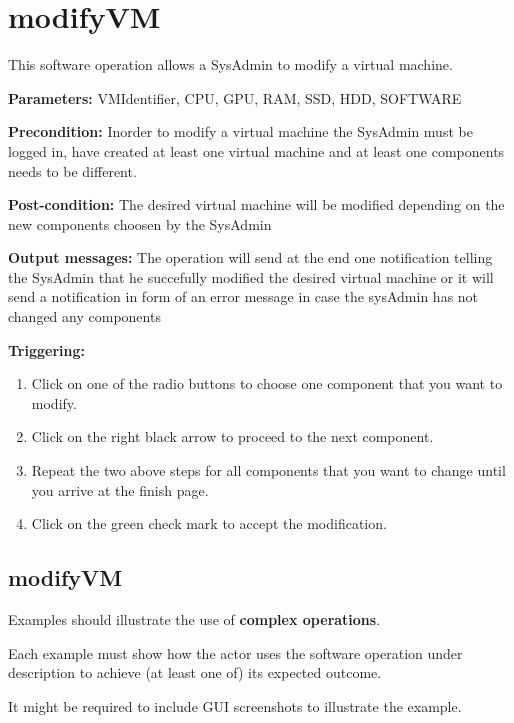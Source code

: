 \section{modifyVM}
\label{operation:modifyVM}
This software operation allows a SysAdmin to modify a virtual machine. 
\begin{description}

\item \textbf{Parameters:} VMIdentifier, CPU, GPU, RAM, SSD, HDD, SOFTWARE
\item \textbf{Precondition:} Inorder to modify a virtual machine the SysAdmin
must be logged in, have created at least one virtual machine and at least one
components needs to be different.
\item \textbf{Post-condition:} The desired virtual machine will be modified
depending on the new components choosen by the SysAdmin
\item \textbf{Output messages:} The operation will send at the end one
notification telling the SysAdmin that he succefully modified the desired
virtual machine or it will send a notification in form of an error message in
case the sysAdmin has not changed any components

\item \textbf{Triggering:}
\begin{enumerate}
\item Click on one of the radio buttons to choose one component that you want
to modify.
\item Click on the right black arrow to proceed to the next component.
\item Repeat the two above steps for all components that you want to change
until you arrive at the finish page.
\item Click on the green check mark to accept the modification.
\end{enumerate}

 
\end{description}

 
\subsection{modifyVM}
Examples should illustrate the use of \textbf{complex operations}.

Each example must show how the actor uses the software operation under
description to achieve (at least one of) its expected outcome.

It might be required to include GUI screenshots to illustrate the example.












